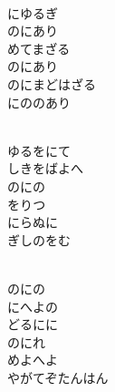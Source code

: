 \documentclass[10pt,b5j]{tarticle} %
\begin{document}
\begin{enumerate}
\begin{minipage}[c]{\blocksize}
        \vspace{\linespace}
        \item~\\
        にゆるぎ\\
        のにあり\\
        めてまざる\\
        のにあり\\
        のにまどはざる\\
        にののあり
        
        \vspace{\linespace}
        \item~\\
        ゆるをにて\\
        しきをばよへ\\
        のにの\\
        をりつ\\
        にらぬに\\
        ぎしのをむ
        
        \vspace{\linespace}
        \item~\\
        のにの\\
        にへよの\\
        どるにに\\
        のにれ\\
        めよへよ\\
        やがてぞたんはん
    
    \end{minipage}
\end{enumerate} %
\end{document}
